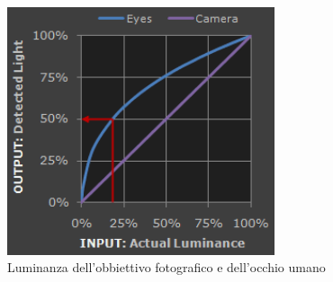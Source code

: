 \begin{figure}[ht]
    \centering
    \includegraphics[width=0.7\textwidth]{preprocessing/gamma.png}
    \caption{Luminanza dell'obbiettivo fotografico e dell'occhio umano}
    \label{fig:gamma}
\end{figure}



